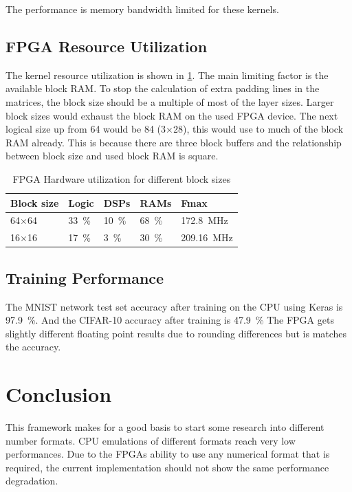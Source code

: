 \documentclass[techrep,english]{ipsj} %
\begin{document}
The performance is memory bandwidth limited for these kernels.

\subsection{FPGA Resource Utilization}
The kernel resource utilization is shown in \cref{tab:fpga-util}.
The main limiting factor is the available block RAM.
To stop the calculation of extra padding lines in the matrices, the block size should be a multiple of most of the layer sizes.
Larger block sizes would exhaust the block RAM on the used FPGA device.
The next logical size up from \num{64} would be \num{84} (\num{3}\(\times\)\num{28}), this would use to much of the block RAM already.
This is because there are three block buffers and the relationship between block size and used block RAM is square.

\begin{table}[h]
  \centering
  \caption{FPGA Hardware utilization for different block sizes}\label{tab:fpga-util}
  \begin{tabular}{lllll}
    \toprule
    \textbf{Block size} & \textbf{Logic} & \textbf{DSPs} & \textbf{RAMs} & \textbf{Fmax} \\
    \midrule    
    64$\times$64 & \SI{33}{\percent} & \SI{10}{\percent} & \SI{68}{\percent} & \SI{172.8}{\mega\hertz}  \\ %
    16$\times$16 & \SI{17}{\percent} & \SI{3}{\percent} & \SI{30}{\percent} & \SI{209.16}{\mega\hertz}  \\ %
    \bottomrule
  \end{tabular}
\end{table}

\subsection{Training Performance}
The MNIST network test set accuracy after training on the CPU using Keras is \SI{97.9}{\percent}.
And the CIFAR-10 accuracy after training is \SI{47.9}{\percent}
The FPGA gets slightly different floating point results due to rounding differences but is matches the accuracy.

\section{Conclusion}\label{sec:conclusion}
This framework makes for a good basis to start some research into different number formats.
CPU emulations of different formats reach very low performances.
Due to the FPGAs ability to use any numerical format that is required, the current implementation should not show the same performance degradation.
\end{document}
